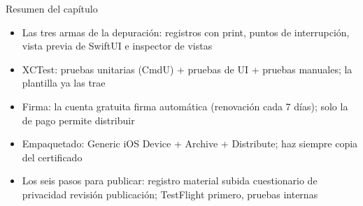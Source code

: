 \begin{tcbsummary}{Resumen del capítulo}
\begin{itemize}
  \item Las tres armas de la depuración: registros con print, puntos de interrupción, vista previa de SwiftUI e inspector de vistas
  \item XCTest: pruebas unitarias (CmdU) + pruebas de UI + pruebas manuales; la plantilla ya las trae
  \item Firma: la cuenta gratuita firma automática (renovación cada 7 días); solo la de pago permite distribuir
  \item Empaquetado: Generic iOS Device + Archive + Distribute; haz siempre copia del certificado
  \item Los seis pasos para publicar: registro material subida cuestionario de privacidad revisión publicación; TestFlight primero, pruebas internas
\end{itemize}

\end{tcbsummary}
